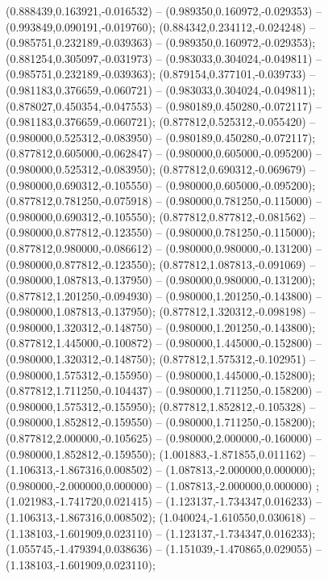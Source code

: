  (0.888439,0.163921,-0.016532) -- (0.989350,0.160972,-0.029353) -- (0.993849,0.090191,-0.019760);
 (0.884342,0.234112,-0.024248) -- (0.985751,0.232189,-0.039363) -- (0.989350,0.160972,-0.029353);
 (0.881254,0.305097,-0.031973) -- (0.983033,0.304024,-0.049811) -- (0.985751,0.232189,-0.039363);
 (0.879154,0.377101,-0.039733) -- (0.981183,0.376659,-0.060721) -- (0.983033,0.304024,-0.049811);
 (0.878027,0.450354,-0.047553) -- (0.980189,0.450280,-0.072117) -- (0.981183,0.376659,-0.060721);
 (0.877812,0.525312,-0.055420) -- (0.980000,0.525312,-0.083950) -- (0.980189,0.450280,-0.072117);
 (0.877812,0.605000,-0.062847) -- (0.980000,0.605000,-0.095200) -- (0.980000,0.525312,-0.083950);
 (0.877812,0.690312,-0.069679) -- (0.980000,0.690312,-0.105550) -- (0.980000,0.605000,-0.095200);
 (0.877812,0.781250,-0.075918) -- (0.980000,0.781250,-0.115000) -- (0.980000,0.690312,-0.105550);
 (0.877812,0.877812,-0.081562) -- (0.980000,0.877812,-0.123550) -- (0.980000,0.781250,-0.115000);
 (0.877812,0.980000,-0.086612) -- (0.980000,0.980000,-0.131200) -- (0.980000,0.877812,-0.123550);
 (0.877812,1.087813,-0.091069) -- (0.980000,1.087813,-0.137950) -- (0.980000,0.980000,-0.131200);
 (0.877812,1.201250,-0.094930) -- (0.980000,1.201250,-0.143800) -- (0.980000,1.087813,-0.137950);
 (0.877812,1.320312,-0.098198) -- (0.980000,1.320312,-0.148750) -- (0.980000,1.201250,-0.143800);
 (0.877812,1.445000,-0.100872) -- (0.980000,1.445000,-0.152800) -- (0.980000,1.320312,-0.148750);
 (0.877812,1.575312,-0.102951) -- (0.980000,1.575312,-0.155950) -- (0.980000,1.445000,-0.152800);
 (0.877812,1.711250,-0.104437) -- (0.980000,1.711250,-0.158200) -- (0.980000,1.575312,-0.155950);
 (0.877812,1.852812,-0.105328) -- (0.980000,1.852812,-0.159550) -- (0.980000,1.711250,-0.158200);
 (0.877812,2.000000,-0.105625) -- (0.980000,2.000000,-0.160000) -- (0.980000,1.852812,-0.159550);
 (1.001883,-1.871855,0.011162) -- (1.106313,-1.867316,0.008502) -- (1.087813,-2.000000,0.000000);
 (0.980000,-2.000000,0.000000) -- (1.087813,-2.000000,0.000000) ;
 (1.021983,-1.741720,0.021415) -- (1.123137,-1.734347,0.016233) -- (1.106313,-1.867316,0.008502);
 (1.040024,-1.610550,0.030618) -- (1.138103,-1.601909,0.023110) -- (1.123137,-1.734347,0.016233);
 (1.055745,-1.479394,0.038636) -- (1.151039,-1.470865,0.029055) -- (1.138103,-1.601909,0.023110);
